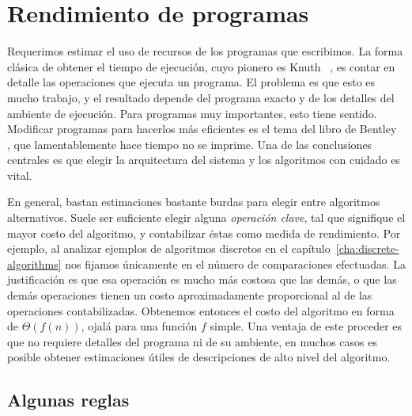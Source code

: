 

\chapter{Rendimiento de programas}
\label{cha:rendimiento}

  Requerimos estimar el uso de recursos de los programas que escribimos.
  La forma clásica de obtener el tiempo de ejecución,
  cuyo pionero es Knuth~%
    \cite{knuth97:_fundam_algor,
          knuth97:_semin_algor,
          knuth98:_sortin_searc},
  es contar en detalle las operaciones que ejecuta un programa.
  El problema es que esto es mucho trabajo,
  y el resultado depende del programa exacto
  y de los detalles del ambiente de ejecución.
  Para programas muy importantes,
  esto tiene sentido.
  Modificar programas para hacerlos más eficientes
  es el tema del libro de Bentley~%
    \cite{bentley82:_writing_efficient_programs},
  que lamentablemente hace tiempo no se imprime.
  Una de las conclusiones centrales es que elegir la arquitectura del sistema
  y los algoritmos con cuidado es vital.

  En general,
  bastan estimaciones bastante burdas
  para elegir entre algoritmos alternativos.
  Suele ser suficiente elegir alguna \emph{operación clave},
  tal que signifique el mayor costo del algoritmo,
  y contabilizar éstas como medida de rendimiento.
  Por ejemplo,
  al analizar ejemplos de algoritmos discretos
  en el capítulo~\ref{cha:discrete-algorithms}
  nos fijamos únicamente en el número de comparaciones efectuadas.
  La justificación es que esa operación es mucho más costosa que las demás,
  o que las demás operaciones
  tienen un costo aproximadamente proporcional
  al de las operaciones contabilizadas.
  Obtenemos entonces el costo del algoritmo en forma de \(\Theta(f(n))\),
  ojalá para una función \(f\) simple.
  Una ventaja de este proceder
  es que no requiere detalles del programa ni de su ambiente,
  en muchos casos es posible obtener estimaciones útiles
  de descripciones de alto nivel del algoritmo.

\section{Algunas reglas}
\label{sec:rules-performance}

